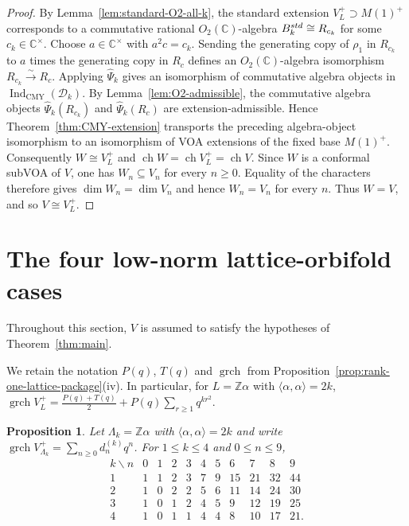 \documentclass[10pt,a4paper]{amsart}
\numberwithin{equation}{section} \newtheorem{thm}{Theorem}[section] \newtheorem{lem}[thm]{Lemma} \newtheorem{ex}[thm]{Example} \newtheorem{prop}[thm]{Proposition} \newtheorem{cor}[thm]{Corollary} \newtheorem{defi}[thm]{Definition} \newtheorem{rmk}[thm]{Remark} \newtheorem{notation}[thm]{Notation}
\newcommand{\ch}{\operatorname{ch}}
\newcommand{\grch}{\operatorname{grch}}
\newcommand{\Dk}{\mathcal D_k}
\newcommand{\IndCMY}{\operatorname{Ind}_{\mathrm{CMY}}}
\newcommand{\Otwo}{O_2(\C)}
\def\Z{\mathbb{Z}} \def\N{\mathbb{N}} \def\A{\mathbb{A}} \def\C{\mathbb{C}} \def\R{\mathbb{R}} \def\Q{\mathbb{Q}} \def\F{\mathbb{F}}
\begin{document}
\begin{proof}
By Lemma~\ref{lem:standard-O2-all-k}, the standard extension $V_L^+\supset M(1)^+$ corresponds to a commutative rational $\Otwo$-algebra \(B_k^{\rm std}\cong R_{c_k}\) for some $c_k\in\C^\times$. Choose $a\in\C^\times$ with $a^2c=c_k$. Sending the generating copy of $\rho_1$ in $R_{c_k}$ to $a$ times the generating copy in $R_c$ defines an $\Otwo$-algebra isomorphism \(R_{c_k}\overset\sim\longrightarrow R_c\). Applying $\widehat\Psi_k$ gives an isomorphism of commutative algebra objects in $\IndCMY(\Dk)$. By Lemma~\ref{lem:O2-admissible}, the commutative algebra objects $\widehat\Psi_k(R_{c_k})$ and $\widehat\Psi_k(R_c)$ are extension-admissible. Hence Theorem~\ref{thm:CMY-extension} transports the preceding algebra-object isomorphism to an isomorphism of VOA extensions of the fixed base $M(1)^+$. Consequently \(W\cong V_L^+\) and \(\ch W=\ch V_L^+=\ch V\). Since $W$ is a conformal subVOA of $V$, one has $W_n\subseteq V_n$ for every $n\ge0$. Equality of the characters therefore gives $\dim W_n=\dim V_n$ and hence $W_n=V_n$ for every $n$. Thus $W=V$, and so \(V\cong V_L^+.\)
\end{proof}

\section{The four low-norm lattice-orbifold cases}\label{sec:low}

Throughout this section, $V$ is assumed to satisfy the hypotheses of Theorem~\ref{thm:main}.

We retain the notation $P(q)$, $T(q)$ and $\grch$ from Proposition~\ref{prop:rank-one-lattice-package}(iv). In particular, for $L=\Z\alpha$ with $\langle\alpha,\alpha\rangle=2k$, \(\grch V_L^+=\frac{P(q)+T(q)}2+P(q)\sum_{r\ge1}q^{kr^2}.\)

\begin{prop}\label{prop:low-table}
Let $\Lambda_k=\Z\alpha$ with $\langle\alpha,\alpha\rangle=2k$ and write \(\grch V_{\Lambda_k}^+=\sum_{n\ge0}d_n^{(k)}q^n\). For $1\le k\le4$ and $0\le n\le9$,
\[
\begin{array}{c|rrrrrrrrrr}
 k\backslash n&0&1&2&3&4&5&6&7&8&9\\ \hline
1&1&1&2&3&7&9&15&21&32&44\\
2&1&0&2&2&5&6&11&14&24&30\\
3&1&0&1&2&4&5&9&12&19&25\\
4&1&0&1&1&4&4&8&10&17&21.
\end{array}
\]
\end{prop}
\end{document}
